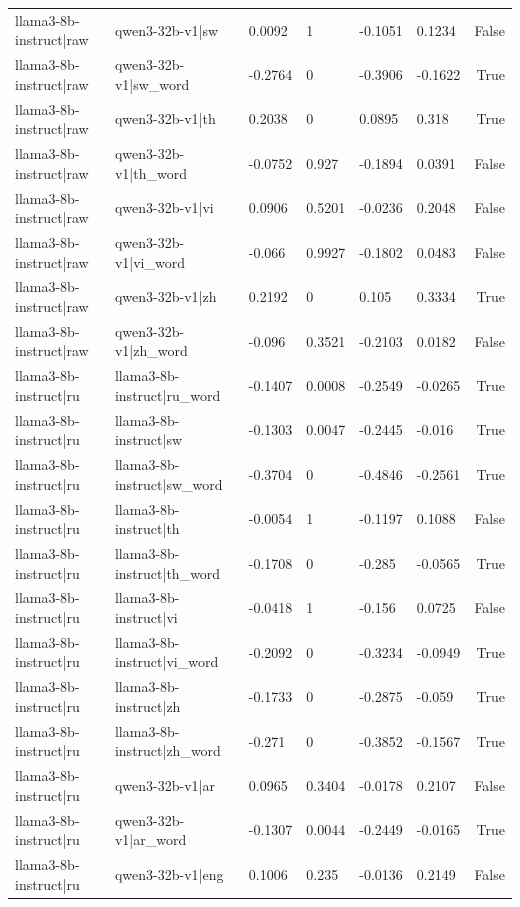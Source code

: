 \begin{table}
\begin{tabular}{llllllr}
llama3-8b-instruct|raw & qwen3-32b-v1|sw & 0.0092 & 1 & -0.1051 & 0.1234 & False \\
llama3-8b-instruct|raw & qwen3-32b-v1|sw_word & -0.2764 & 0 & -0.3906 & -0.1622 & True \\
llama3-8b-instruct|raw & qwen3-32b-v1|th & 0.2038 & 0 & 0.0895 & 0.318 & True \\
llama3-8b-instruct|raw & qwen3-32b-v1|th_word & -0.0752 & 0.927 & -0.1894 & 0.0391 & False \\
llama3-8b-instruct|raw & qwen3-32b-v1|vi & 0.0906 & 0.5201 & -0.0236 & 0.2048 & False \\
llama3-8b-instruct|raw & qwen3-32b-v1|vi_word & -0.066 & 0.9927 & -0.1802 & 0.0483 & False \\
llama3-8b-instruct|raw & qwen3-32b-v1|zh & 0.2192 & 0 & 0.105 & 0.3334 & True \\
llama3-8b-instruct|raw & qwen3-32b-v1|zh_word & -0.096 & 0.3521 & -0.2103 & 0.0182 & False \\
llama3-8b-instruct|ru & llama3-8b-instruct|ru_word & -0.1407 & 0.0008 & -0.2549 & -0.0265 & True \\
llama3-8b-instruct|ru & llama3-8b-instruct|sw & -0.1303 & 0.0047 & -0.2445 & -0.016 & True \\
llama3-8b-instruct|ru & llama3-8b-instruct|sw_word & -0.3704 & 0 & -0.4846 & -0.2561 & True \\
llama3-8b-instruct|ru & llama3-8b-instruct|th & -0.0054 & 1 & -0.1197 & 0.1088 & False \\
llama3-8b-instruct|ru & llama3-8b-instruct|th_word & -0.1708 & 0 & -0.285 & -0.0565 & True \\
llama3-8b-instruct|ru & llama3-8b-instruct|vi & -0.0418 & 1 & -0.156 & 0.0725 & False \\
llama3-8b-instruct|ru & llama3-8b-instruct|vi_word & -0.2092 & 0 & -0.3234 & -0.0949 & True \\
llama3-8b-instruct|ru & llama3-8b-instruct|zh & -0.1733 & 0 & -0.2875 & -0.059 & True \\
llama3-8b-instruct|ru & llama3-8b-instruct|zh_word & -0.271 & 0 & -0.3852 & -0.1567 & True \\
llama3-8b-instruct|ru & qwen3-32b-v1|ar & 0.0965 & 0.3404 & -0.0178 & 0.2107 & False \\
llama3-8b-instruct|ru & qwen3-32b-v1|ar_word & -0.1307 & 0.0044 & -0.2449 & -0.0165 & True \\
llama3-8b-instruct|ru & qwen3-32b-v1|eng & 0.1006 & 0.235 & -0.0136 & 0.2149 & False \\

\end{tabular}
\end{table}
